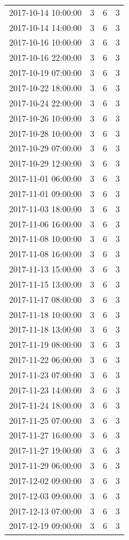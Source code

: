 \begin{tabular}{lrrr}
2017-10-14 10:00:00 & 3 & 6 & 3 \\
2017-10-14 14:00:00 & 3 & 6 & 3 \\
2017-10-16 10:00:00 & 3 & 6 & 3 \\
2017-10-16 22:00:00 & 3 & 6 & 3 \\
2017-10-19 07:00:00 & 3 & 6 & 3 \\
2017-10-22 18:00:00 & 3 & 6 & 3 \\
2017-10-24 22:00:00 & 3 & 6 & 3 \\
2017-10-26 10:00:00 & 3 & 6 & 3 \\
2017-10-28 10:00:00 & 3 & 6 & 3 \\
2017-10-29 07:00:00 & 3 & 6 & 3 \\
2017-10-29 12:00:00 & 3 & 6 & 3 \\
2017-11-01 06:00:00 & 3 & 6 & 3 \\
2017-11-01 09:00:00 & 3 & 6 & 3 \\
2017-11-03 18:00:00 & 3 & 6 & 3 \\
2017-11-06 16:00:00 & 3 & 6 & 3 \\
2017-11-08 10:00:00 & 3 & 6 & 3 \\
2017-11-08 16:00:00 & 3 & 6 & 3 \\
2017-11-13 15:00:00 & 3 & 6 & 3 \\
2017-11-15 13:00:00 & 3 & 6 & 3 \\
2017-11-17 08:00:00 & 3 & 6 & 3 \\
2017-11-18 10:00:00 & 3 & 6 & 3 \\
2017-11-18 13:00:00 & 3 & 6 & 3 \\
2017-11-19 08:00:00 & 3 & 6 & 3 \\
2017-11-22 06:00:00 & 3 & 6 & 3 \\
2017-11-23 07:00:00 & 3 & 6 & 3 \\
2017-11-23 14:00:00 & 3 & 6 & 3 \\
2017-11-24 18:00:00 & 3 & 6 & 3 \\
2017-11-25 07:00:00 & 3 & 6 & 3 \\
2017-11-27 16:00:00 & 3 & 6 & 3 \\
2017-11-27 19:00:00 & 3 & 6 & 3 \\
2017-11-29 06:00:00 & 3 & 6 & 3 \\
2017-12-02 09:00:00 & 3 & 6 & 3 \\
2017-12-03 09:00:00 & 3 & 6 & 3 \\
2017-12-13 07:00:00 & 3 & 6 & 3 \\
2017-12-19 09:00:00 & 3 & 6 & 3 \\

\end{tabular}
